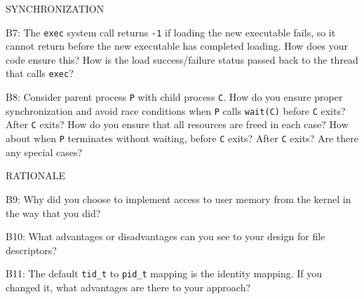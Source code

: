 \begin{aspect}{SYNCHRONIZATION}
	\begin{qc}
		B7: The \lstinline{exec} system call returns \lstinline{-1}
		if loading the new executable fails, so it cannot return before the new executable has completed loading.
		How does your code ensure this?
		How is the load success/failure status passed back to the thread that calls \lstinline{exec}?
	\end{qc}

	\begin{qc}
		B8: Consider parent process \lstinline{P} with child process \lstinline{C}.
		How do you ensure proper synchronization and avoid race conditions
		when \lstinline{P} calls \lstinline{wait(C)} before \lstinline{C} exits? After \lstinline{C} exits?
		How do you ensure that all resources are freed in each case?
		How about when \lstinline{P} terminates without waiting, before \lstinline{C} exits? After \lstinline{C} exits?
		Are there any special cases?
	\end{qc}

\end{aspect}

\begin{aspect}{RATIONALE}
	\begin{qc}
		B9: Why did you choose to implement access to user memory from the kernel in the way that you did?
	\end{qc}

	\begin{qc}
		B10: What advantages or disadvantages can you see to your design for file descriptors?
	\end{qc}

	\begin{qc}
		B11: The default \lstinline{tid_t} to \lstinline{pid_t} mapping is the identity mapping.
		If you changed it, what advantages are there to your approach?
	\end{qc}
\end{aspect}
